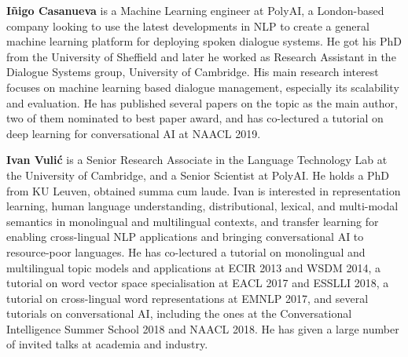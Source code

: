 \begin{bio}
\textbf{I\~nigo Casanueva} is a Machine Learning engineer at PolyAI, a London-based company looking to use the latest developments in NLP to create a general machine learning platform for deploying spoken dialogue systems. He got his PhD from the University of Sheffield and later he worked as Research Assistant in the Dialogue Systems group, University of Cambridge. His main research interest focuses on machine learning based dialogue management, especially its scalability and evaluation. He has published several papers on the topic as the main author, two of them nominated to best paper award, and has co-lectured a tutorial on deep learning for conversational AI at NAACL 2019. 


\textbf{Ivan Vuli\'c} is a Senior Research Associate in the Language Technology Lab at the University of
Cambridge, and a Senior Scientist at PolyAI. He holds a PhD from KU Leuven, obtained summa
cum laude. Ivan is interested in representation learning, human language understanding, distributional, lexical, and multi-modal semantics in monolingual and multilingual contexts, and transfer learning for enabling cross-lingual NLP applications and bringing conversational AI to resource-poor languages. He has co-lectured a tutorial on monolingual and multilingual topic models and applications at ECIR 2013 and WSDM 2014, a tutorial on word vector space specialisation at EACL 2017 and ESSLLI 2018, a tutorial on cross-lingual word representations at EMNLP 2017, and several tutorials on conversational AI, including the ones at the Conversational Intelligence Summer School 2018 and NAACL 2018. He has given a large number of invited talks at academia and industry.


\end{bio}

